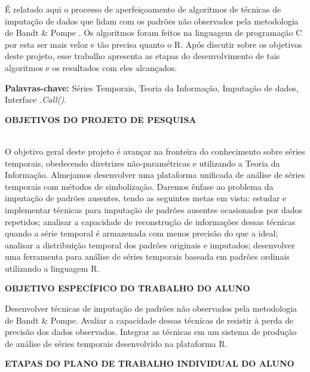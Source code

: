 \documentclass{article}
\begin{document}
É relatado aqui o processo de aperfeiçoamento de algoritmos de técnicas de imputação de dados que lidam com os padrões não observados pela metodologia de Bandt \& Pompe \cite{bandt2002permutation}. Os algoritmos foram feitos na linguagem de programação C por esta ser mais veloz e tão precisa quanto o R. Após discutir sobre os objetivos deste projeto, esse trabalho apresenta as etapas do desenvolvimento de tais algoritmos e os resultados com eles alcançados.


\textbf{Palavras-chave:} Séries Temporais, Teoria da Informação, Imputação de dados, Interface \textit{.Call()}.
 
\newpage
\begin{center}
\textbf{\large{OBJETIVOS DO PROJETO DE PESQUISA}}\\
\hrulefill \\
\end{center}
          
O objetivo geral deste projeto é avançar na fronteira do conhecimento sobre séries temporais, obedecendo diretrizes não-paramétricas e utilizando a Teoria da Informação.
Almejamos desenvolver uma plataforma unificada de análise de séries temporais com métodos de simbolização. Daremos ênfase ao problema da imputação de padrões ausentes, tendo as seguintes metas em vista: estudar e implementar técnicas para imputação de padrões ausentes ocasionados por dados repetidos; analisar a capacidade de reconstrução de informações dessas técnicas quando a série temporal é armazenada com menos precisão do que a ideal; analisar a distribuição temporal dos padrões originais e imputados; desenvolver uma ferramenta para análise de séries temporais baseada em padrões ordinais utilizando a linguagem R.
    
\newpage
\begin{center}
\textbf{\large{OBJETIVO ESPECÍFICO DO TRABALHO DO ALUNO}}

\hrulefill 

\end{center}
    
Desenvolver técnicas de imputação de padrões não observados pela metodologia de Bandt \& Pompe. Avaliar a capacidade dessas técnicas de resistir à perda de precisão dos dados observados. Integrar as técnicas em um sistema de produção de análise de séries temporais desenvolvido na plataforma R.
    
\newpage
\begin{center}
\textbf{\large{ETAPAS DO PLANO DE TRABALHO INDIVIDUAL DO ALUNO}}

\hrulefill 

\end{center}
\end{document}
